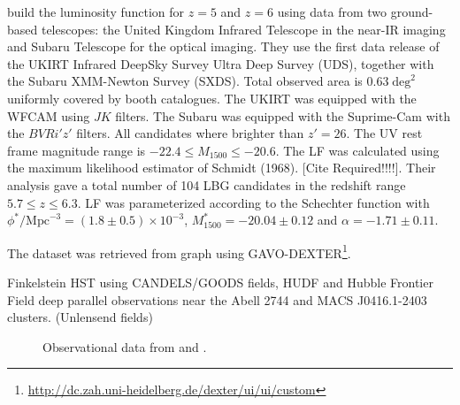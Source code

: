 \citet{mclure09} build the luminosity function for $z=5$ and $z=6$ using data from two ground-based
 telescopes: the United Kingdom Infrared Telescope in the near-IR imaging and Subaru 
 Telescope for the optical imaging. They use the first data release of the UKIRT Infrared 
 DeepSky Survey Ultra Deep Survey (UDS), together with the Subaru XMM-Newton 
 Survey (SXDS). Total observed area is $0.63 \deg^2$ uniformly covered by booth catalogues.
The UKIRT was equipped with the WFCAM using $J K$ filters. The Subaru was equipped 
with the Suprime-Cam with the $B V R i' z'$ filters. All candidates where brighter than 
$z'=26$. The UV rest frame magnitude range is $-22.4\leq M_{1500} \leq-20.6$. The LF 
was calculated using the maximum likelihood estimator of Schmidt (1968). [Cite Required!!!!]. 
Their analysis gave a total number of 104 LBG candidates in the redshift range 
$5.7\leq z \leq 6.3$. LF was parameterized according to the Schechter function with 
$\phi^* / \textrm{Mpc}^{-3} =(1.8 \pm 0.5) \times 10 ^{-3}$, $M^*_{1500} = -20.04\pm 0.12$ 
and $\alpha = -1.71 \pm 0.11$. 

The dataset was retrieved from \cite{mclure09} graph using
GAVO-DEXTER\footnote{\url{http://dc.zah.uni-heidelberg.de/dexter/ui/ui/custom}}.

Finkelstein
HST using CANDELS/GOODS fields, HUDF and Hubble Frontier Field deep parallel observations near the Abell 2744 and MACS J0416.1-2403 clusters. (Unlensend fields)




\begin{figure}
\caption{Observational data from \cite{bouwens14,mclure09}and \cite{willott13}.}
\label{graph_observational_data}
\end{figure}

